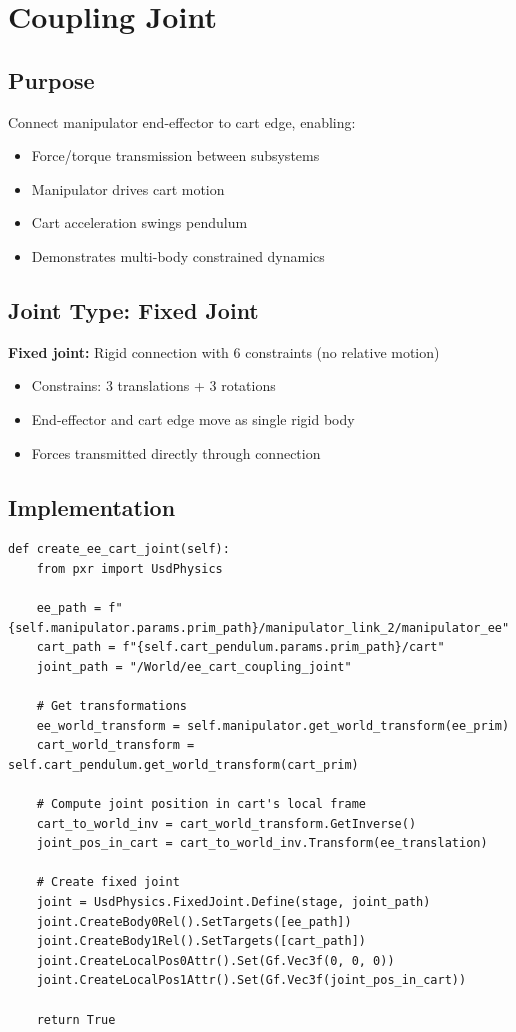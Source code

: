 \documentclass[11pt,a4paper]{article}
\begin{document}
\section{Coupling Joint}

\subsection{Purpose}

Connect manipulator end-effector to cart edge, enabling:
\begin{itemize}
    \item Force/torque transmission between subsystems
    \item Manipulator drives cart motion
    \item Cart acceleration swings pendulum
    \item Demonstrates multi-body constrained dynamics
\end{itemize}

\subsection{Joint Type: Fixed Joint}

\textbf{Fixed joint:} Rigid connection with 6 constraints (no relative motion)
\begin{itemize}
    \item Constrains: 3 translations + 3 rotations
    \item End-effector and cart edge move as single rigid body
    \item Forces transmitted directly through connection
\end{itemize}

\subsection{Implementation}

\begin{lstlisting}
def create_ee_cart_joint(self):
    from pxr import UsdPhysics
    
    ee_path = f"{self.manipulator.params.prim_path}/manipulator_link_2/manipulator_ee"
    cart_path = f"{self.cart_pendulum.params.prim_path}/cart"
    joint_path = "/World/ee_cart_coupling_joint"
    
    # Get transformations
    ee_world_transform = self.manipulator.get_world_transform(ee_prim)
    cart_world_transform = self.cart_pendulum.get_world_transform(cart_prim)
    
    # Compute joint position in cart's local frame
    cart_to_world_inv = cart_world_transform.GetInverse()
    joint_pos_in_cart = cart_to_world_inv.Transform(ee_translation)
    
    # Create fixed joint
    joint = UsdPhysics.FixedJoint.Define(stage, joint_path)
    joint.CreateBody0Rel().SetTargets([ee_path])
    joint.CreateBody1Rel().SetTargets([cart_path])
    joint.CreateLocalPos0Attr().Set(Gf.Vec3f(0, 0, 0))
    joint.CreateLocalPos1Attr().Set(Gf.Vec3f(joint_pos_in_cart))
    
    return True
\end{lstlisting}
\end{document}
